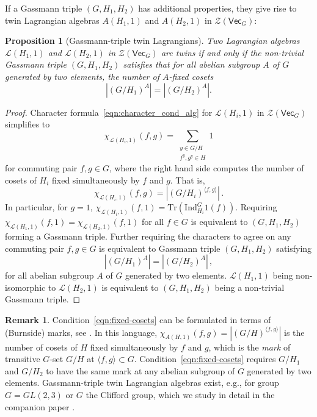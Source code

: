 \documentclass[aps,twocolumn,prx,floatfix,preprintnumbers, nofootinbib,10pt]{revtex4-2}
\numberwithin{equation}{section}
\newtheorem{proposition}[theorem]{Proposition}
\theoremstyle{definition}
\newtheorem{remark}[theorem]{\bf Remark}
\newcommand{\Ind}{\text{Ind}}
\newcommand{\cL}{\mathcal{L}}
\newcommand{\cZ}{\mathcal{Z}}
\newcommand{\Tr}{\text{Tr}}
\renewcommand{\Vec}{\mathsf{Vec}}
\begin{document}
If a Gassmann triple $(G, H_1, H_2)$ has additional properties, they give rise to twin Lagrangian algebras $A(H_1,1)$ and $A(H_2,1)$ in $\cZ(\Vec_G)$:
\begin{proposition}[Gassmann-triple twin Lagrangians]
\label{prop:GassmannLagrangian}
    Two Lagrangian algebras $\cL(H_1,1)$ and $\cL(H_2,1)$ in $\cZ(\Vec_G)$ are twins if and only if the non-trivial Gassmann triple $(G, H_1, H_2)$ satisfies that for all abelian subgroup $A$ of $G$ generated by two elements, the number of $A$-fixed cosets
    \begin{equation}
    \label{eqn:fixed-cosets}
        |(G/H_1)^{A}|=|(G/H_2)^{A}|.
    \end{equation}
\end{proposition}
\begin{proof}
    Character formula~\eqref{eqn:character_cond_alg} for $\cL(H_i,1)$ in $\cZ(\Vec_G)$ simplifies to
    \begin{equation}
        \chi_{\cL(H_i,1)}(f,g)=\sum_{\substack{y\in G/H \\ f^{y},g^y\in H}}1
    \end{equation}
    for commuting pair $f,g\in G$,
    where the right hand side computes the number of cosets of $H_i$ fixed simultaneously by $f$ and $g$. That is,
    \begin{equation}
        \chi_{\cL(H_i,1)}(f,g)=|(G/H_i)^{\langle f, g\rangle}|\,.
    \end{equation}
    In particular, for $g=1$, $\chi_{\cL(H_i,1)}(f,1)=\Tr(\Ind^G_{H_i}1(f))$. Requiring $\chi_{\cL(H_1,1)}(f,1)=\chi_{\cL(H_2,1)}(f,1)$ for all $f\in G$ is equivalent to $(G, H_1, H_2)$ forming a Gassmann triple. Further requiring the characters to agree on any commuting pair $f,g\in G$ is equivalent to Gassmann triple $(G,H_1,H_2)$ satisfying
    \begin{equation}
        |(G/H_1)^{A}|=|(G/H_2)^{A}|\,,
    \end{equation}
    for all abelian subgroup $A$ of $G$ generated by two elements. $\cL(H_1,1)$ being non-isomorphic to $\cL(H_2,1)$ is equivalent to $(G, H_1, H_2)$ being a non-trivial Gassmann triple.
\end{proof}
\begin{remark}
    Condition~\eqref{eqn:fixed-cosets} can be formulated in terms of (Burnside) marks, see \cite{Pfeiffer01011997}. In this language, $\chi_{A(H,1)}(f,g)=|(G/H)^{\langle f, g\rangle}|$ is the number of cosets of $H$ fixed simultaneously by $f$ and $g$, which is the \emph{mark} of transitive $G$-set $G/H$ at $\langle f,g \rangle \subset G$. Condition~\eqref{eqn:fixed-cosets} requires $G/H_1$ and $G/H_2$ to have the same mark at any abelian subgroup of $G$ generated by two elements.
    Gassmann-triple twin Lagrangian algebras exist, e.g., for group $G=GL(2,3)$ or $G$ the Clifford group, which we study in detail in the companion paper \cite{WGS}.
\end{remark}
\end{document}
